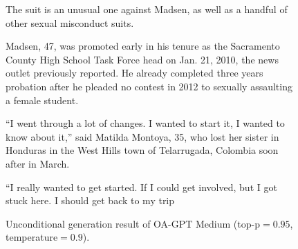 \begin{figure}[p]
\begin{minipage}{\textwidth}
{The suit is an unusual one against Madsen, as well as a handful of other sexual misconduct suits.

Madsen, 47, was promoted early in his tenure as the Sacramento County High School Task Force head on Jan. 21, 2010, the news outlet previously reported. He already completed three years probation after he pleaded no contest in 2012 to sexually assaulting a female student.

“I went through a lot of changes. I wanted to start it, I wanted to know about it,” said Matilda Montoya, 35, who lost her sister in Honduras in the West Hills town of Telarrugada, Colombia soon after in March.

“I really wanted to get started. If I could get involved, but I got stuck here. I should get back to my trip
  }
  \end{minipage}
\caption{Unconditional generation result of OA-GPT Medium (top-p$=0.95$, temperature$=0.9$).}
\label{fig:text0.950.9}
\end{figure}

